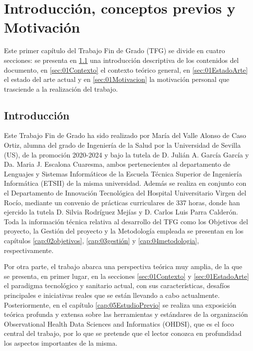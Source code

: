 \chapter{Introducción, conceptos previos y Motivación}\label{cap:introduccion}

Este primer capítulo del Trabajo Fin de Grado (TFG) se divide en cuatro secciones: se presenta en \ref{sec:01Intro} una introducción descriptiva de los contenidos del documento, en \ref{sec:01Contexto} el contexto teórico general, en \ref{sec:01EstadoArte} el estado del arte actual y en \ref{sec:01Motivacion} la motivación personal que trasciende a la realización del trabajo.

\section{Introducción} \label{sec:01Intro}

Este Trabajo Fin de Grado ha sido realizado por María del Valle Alonso de Caso Ortiz, alumna del grado de Ingeniería de la Salud por la Universidad de Sevilla (US), de la promoción 2020-2024 y bajo la tutela de D. Julián A. García García y Da. Maria J. Escalona Cuaresma, ambos pertenecientes al departamento de Lenguajes y Sistemas Informáticos de la Escuela Técnica Superior de Ingeniería Informática (ETSII) de la misma universidad. Además se realiza en conjunto con el Departamento de Innovación Tecnológica del Hospital Universitario Virgen del Rocío, mediante un convenio de prácticas curriculares de 337 horas, donde han ejercido la tutela D. Silvia Rodríguez Mejías y D. Carlos Luis Parra Calderón. Toda la información técnica relativa al desarrollo del TFG como los Objetivos del proyecto, la Gestión del proyecto y la Metodología empleada se presentan en los capítulos \ref{cap:02objetivos}, \ref{cap:03gestión} y \ref{cap:04metodologia}, respectivamente.

Por otra parte, el trabajo abarca una perspectiva teórica muy amplia, de la que se presenta, en primer lugar, en la secciones \ref{sec:01Contexto} y \ref{sec:01EstadoArte} el paradigma tecnológico y sanitario actual, con sus características, desafíos principales e iniciativas reales que se están llevando a cabo actualmente. Posteriormente, en el capítulo \ref{cap:05EstudioPrevio} se realiza una exposición teórica profunda y extensa sobre las herramientas y estándares de la organización Observational Health Data Sciences and Informatics (OHDSI), que es el foco central del trabajo, por lo que se pretende que el lector conozca en profundidad los aspectos importantes de la misma.

